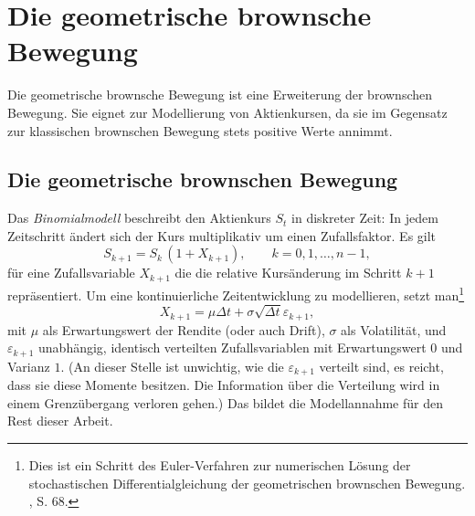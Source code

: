 \section{Die geometrische brownsche Bewegung}

Die geometrische brownsche Bewegung ist eine Erweiterung der brownschen Bewegung. 
Sie eignet zur Modellierung von Aktienkursen, da sie im Gegensatz zur klassischen 
brownschen Bewegung stets positive Werte annimmt.


\subsection{Die geometrische brownschen Bewegung}

Das \textit{Binomialmodell} beschreibt den Aktienkurs $S_t$ in diskreter Zeit: In jedem Zeitschritt ändert sich der Kurs multiplikativ um einen Zufallsfaktor. Es gilt
$$
S_{k+1} = S_k \,(1 + X_{k+1}), \qquad k = 0,1,\dots,n-1,
$$
für eine Zufallsvariable $X_{k+1}$ die die relative Kursänderung im Schritt $k+1$ repräsentiert. Um eine kontinuierliche Zeitentwicklung zu modellieren, 
setzt man\footnote{Dies ist ein Schritt des Euler-Verfahren zur numerischen Lösung der 
stochastischen Differentialgleichung der geometrischen brownschen Bewegung. \cite{iacus2008}, S. 68.}
$$
X_{k+1} = \mu  \Delta t + \sigma \sqrt{\Delta t}\varepsilon_{k+1},
$$
mit $\mu$ als Erwartungswert der Rendite (oder auch Drift), $\sigma$ als Volatilität, und $\varepsilon_{k+1}$ unabhängig, identisch verteilten Zufallsvariablen mit Erwartungswert $0$ und Varianz $1$. 
(An dieser Stelle ist unwichtig, wie die $\varepsilon_{k+1}$ verteilt sind, es reicht, dass sie diese Momente besitzen. 
Die Information über die Verteilung wird in einem Grenzübergang verloren gehen.)
Das bildet die Modellannahme für den Rest dieser Arbeit.

